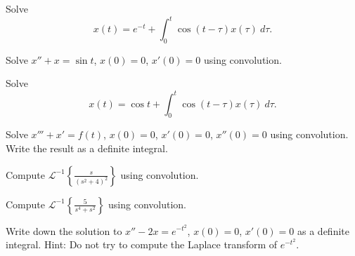 \documentclass{ximera}
\begin{document}
\begin{exercise}
    Solve
    \begin{equation*}
        x(t) =  e^{-t} + \int_0^t \cos(t-\tau) x(\tau) ~ d\tau .
    \end{equation*}
\end{exercise}

\begin{exercise}%
    Solve $x''+x = \sin t$, $x(0) = 0$, $x'(0)=0$ using convolution.
\end{exercise}

\begin{exercise}
    Solve
    \begin{equation*}
        x(t) =  \cos t + \int_0^t \cos(t-\tau) x(\tau) ~ d\tau .
    \end{equation*}
\end{exercise}

\begin{exercise}%
    Solve $x'''+x' = f(t)$, $x(0) = 0$, $x'(0)=0$, $x''(0)=0$ using convolution. Write the result as a definite integral.
\end{exercise}

\begin{exercise}
    Compute ${\mathcal{L}}^{-1} \left\{ \frac{s}{{(s^2+4)}^2} \right\}$ using convolution.
\end{exercise}

\begin{exercise}%
    Compute ${\mathcal{L}}^{-1} \left\{ \frac{5}{s^4+s^2} \right\}$ using convolution.
\end{exercise}

\begin{exercise}
    Write down the solution to $x''-2x=e^{-t^2}$, $x(0)=0$, $x'(0)=0$ as a definite integral.  Hint: Do not try to compute the Laplace transform of $e^{-t^2}$.
\end{exercise}

\end{document}
